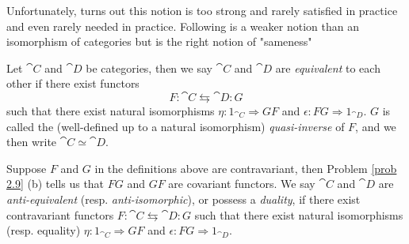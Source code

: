 Unfortunately, turns out this notion is too strong and rarely satisfied in practice and even rarely needed in practice. Following is a weaker notion than an isomorphism of categories but is the right notion of "sameness"

\begin{definition}
Let $\cat{C}$ and $\cat{D}$ be categories, then we say $\cat{C}$ and $\cat{D}$ are \emph{equivalent} to each other if there exist functors \[F:\cat{C} \leftrightarrows \cat{D}:G\] such that there exist natural isomorphisms $\eta: 1_{\cat{C}} \Rightarrow GF$ and $\epsilon: FG \Rightarrow 1_{\cat{D}}$. $G$ is called the (well-defined up to a natural isomorphism) \emph{quasi-inverse} of $F$, and we then write $\cat{C} \simeq \cat{D}$.
\end{definition}

\vspace*{0.1in}

\begin{remark}
Suppose $F$ and $G$ in the definitions above are contravariant, then Problem \ref{prob 2.9} (b) tells us that $FG$ and $GF$ are covariant functors. We say $\cat{C}$ and $\cat{D}$ are \emph{anti-equivalent} (resp. \emph{anti-isomorphic}), or possess a \emph{duality}, if there exist contravariant functors $F:\cat{C} \leftrightarrows \cat{D}:G$ such that there exist natural isomorphisms (resp. equality) $\eta: 1_{\cat{C}} \Rightarrow GF$ and $\epsilon: FG \Rightarrow 1_{\cat{D}}$.
\end{remark}

\vspace*{0.1in}

